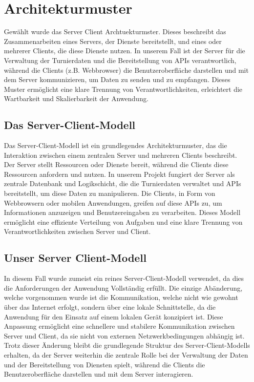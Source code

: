\section{Architekturmuster}
Gewählt wurde das Server Client Archtuekturmster. Dieses beschreibt das Zusammenarbeiten eines Servers, der Dienste bereitstellt, und eines oder mehrerer Clients, die diese Dienste nutzen. In unserem Fall ist der Server für die Verwaltung der Turnierdaten und die Bereitstellung von APIs verantwortlich, während die Clients (z.B. Webbrowser) die Benutzeroberfläche darstellen und mit dem Server kommunizieren, um Daten zu senden und zu empfangen. Dieses Muster ermöglicht eine klare Trennung von Verantwortlichkeiten, erleichtert die Wartbarkeit und Skalierbarkeit der Anwendung.
\subsection{Das Server-Client-Modell}

Das Server-Client-Modell ist ein grundlegendes Architekturmuster, das die Interaktion zwischen einem zentralen Server und mehreren Clients beschreibt. Der Server stellt Ressourcen oder Dienste bereit, während die Clients diese Ressourcen anfordern und nutzen. In unserem Projekt fungiert der Server als zentrale Datenbank und Logikschicht, die die Turnierdaten verwaltet und APIs bereitstellt, um diese Daten zu manipulieren. Die Clients, in Form von Webbrowsern oder mobilen Anwendungen, greifen auf diese APIs zu, um Informationen anzuzeigen und Benutzereingaben zu verarbeiten. Dieses Modell ermöglicht eine effiziente Verteilung von Aufgaben und eine klare Trennung von Verantwortlichkeiten zwischen Server und Client.

\subsection{Unser Server Client-Modell}

In diesem Fall wurde zumeist ein reines Server-Client-Modell verwendet, da dies die Anforderungen der Anwendung Vollständig erfüllt. Die einzige Abänderung, welche vorgenommen wurde ist die Kommunikation, welche nicht wie gewohnt über das Internet erfolgt, sondern über eine lokale Schnittstelle, da die Anwendung für den Einsatz auf einem lokalen Gerät konzipiert ist. Diese Anpassung ermöglicht eine schnellere und stabilere Kommunikation zwischen Server und Client, da sie nicht von externen Netzwerkbedingungen abhängig ist. Trotz dieser Änderung bleibt die grundlegende Struktur des Server-Client-Modells erhalten, da der Server weiterhin die zentrale Rolle bei der Verwaltung der Daten und der Bereitstellung von Diensten spielt, während die Clients die Benutzeroberfläche darstellen und mit dem Server interagieren.

